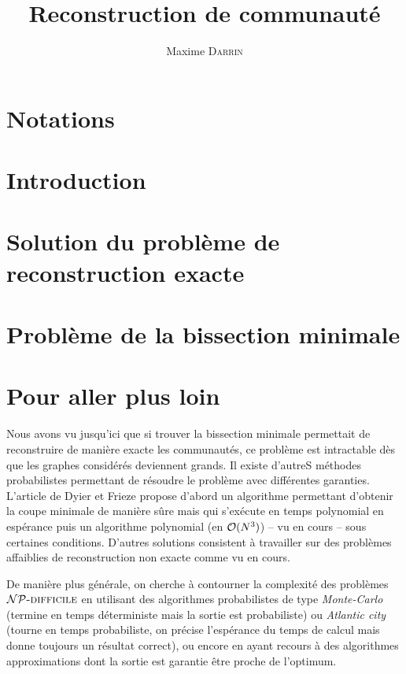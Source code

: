 \documentclass[fleqn,11pt, french]{article}
\title{Reconstruction de communauté}
\author{Maxime \textsc{Darrin}}
\begin{document}
	\maketitle
	\tableofcontents

	\newpage
	
	\section*{Notations}
	
	
	
	\newpage
	\section{Introduction}
	
	
	\section{Solution du problème de reconstruction exacte}
	
	
	
	\section{Problème de la bissection minimale}
	
	
	
	\section{Pour aller plus loin}
	
	Nous avons vu jusqu'ici que si trouver la bissection minimale permettait de reconstruire de manière exacte les communautés, ce problème est intractable dès que les graphes considérés deviennent grands. Il existe d'autreS méthodes probabilistes permettant de résoudre le problème avec différentes garanties. L'article de Dyier et Frieze\cite{dyier} propose d'abord un algorithme permettant d'obtenir la coupe minimale de manière sûre mais qui s'exécute en temps polynomial en espérance puis un algorithme polynomial (en $\mathcal O(N^3)$) -- vu en cours --  sous certaines conditions. D'autres solutions consistent à travailler sur des problèmes affaiblies de reconstruction non exacte comme vu en cours. 
	
	De manière plus générale, on cherche à contourner la complexité des problèmes $\mathcal{NP}\text{\textsc{-difficile}}$ en utilisant des algorithmes probabilistes de type \emph{Monte-Carlo} (termine en temps déterministe mais la sortie est probabiliste) ou \emph{Atlantic city} (tourne en temps probabiliste, on précise l'espérance du temps de calcul mais donne toujours un résultat correct), ou encore en ayant recours à des algorithmes approximations dont la sortie est garantie être proche de l'optimum.
	
\end{document}

